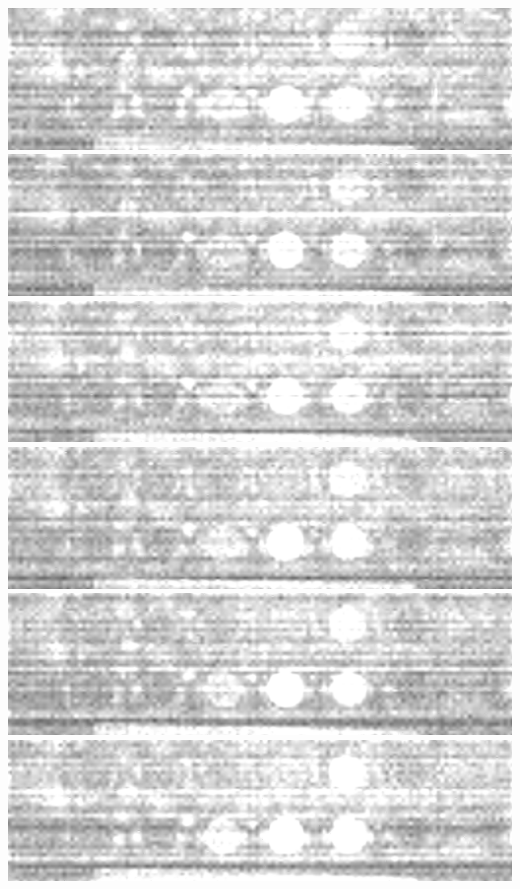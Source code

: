 \documentclass{beamer}
\begin{document}
\begin{frame}
        \includegraphics[height=0.023\textheight]{spatial-denoised/wavelet_den_19.png}
        \includegraphics[height=0.023\textheight]{spatial-denoised/wavelet_den_20.png}
        \includegraphics[height=0.023\textheight]{spatial-denoised/wavelet_den_21.png}
        \includegraphics[height=0.023\textheight]{spatial-denoised/wavelet_den_22.png}
        \includegraphics[height=0.023\textheight]{spatial-denoised/wavelet_den_23.png}
        \includegraphics[height=0.023\textheight]{spatial-denoised/wavelet_den_24.png}

\end{frame}
\end{document}
